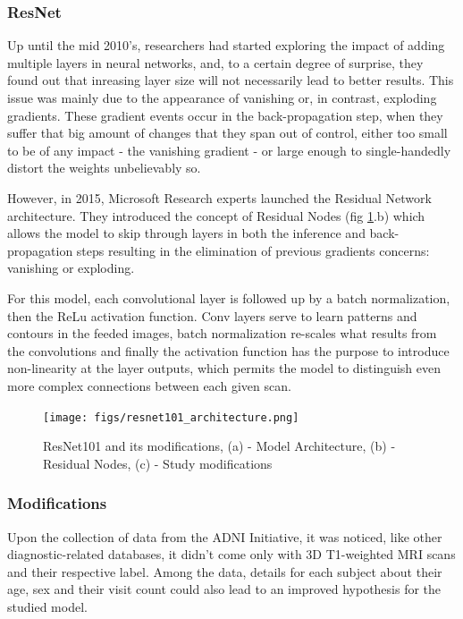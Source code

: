 \documentclass[a4paper, 12pt]{article}
\begin{document}
\subsubsection{ResNet}
Up until the mid 2010's, researchers had started exploring the impact of adding multiple layers in neural networks, and, to
a certain degree of surprise, they found out that inreasing layer size will not necessarily lead to better results. This issue
was mainly due to the appearance of vanishing or, in contrast, exploding gradients. These gradient events occur in the
back-propagation step, when they suffer that big amount of changes that they span out of control, either too small to
be of any impact - the vanishing gradient - or large enough to single-handedly distort the weights unbelievably so.

However, in 2015, Microsoft Research experts launched the Residual Network architecture. They introduced the concept of Residual Nodes
(fig \ref{fig:resnet101_architecture}.b) which allows the model to skip through layers in both the inference and back-propagation steps
resulting in the elimination of previous gradients concerns: vanishing or exploding.

For this model, each convolutional layer is followed up by a batch normalization, then the ReLu activation function. Conv layers serve
to learn patterns and contours in the feeded images, batch normalization re-scales what results from the convolutions and finally
the activation function has the purpose to introduce non-linearity at the layer outputs, which permits the model to distinguish
even more complex connections between each given scan.

\begin{figure}[htbp]
    \centering
    \texttt{[image: figs/resnet101\_architecture.png]}
    \caption{ResNet101 and its modifications, (a) - Model Architecture, (b) - Residual Nodes, (c) - Study modifications}
    \label{fig:resnet101_architecture}
\end{figure}

\subsubsection{Modifications}
Upon the collection of data from the ADNI Initiative, it was noticed, like other diagnostic-related databases, it didn't come only with
3D T1-weighted MRI scans and their respective label. Among the data, details for each subject about their age, sex and their visit count
could also lead to an improved hypothesis for the studied model.
\end{document}
